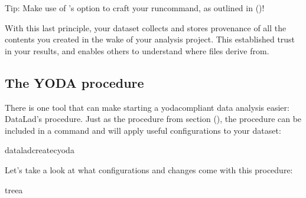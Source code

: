 \sphinxAtStartPar
Tip: Make use of ’s  option to craft your run\sphinxhyphen{}command, as outlined in {\hyperref[\detokenize{basics/101-110-run2:dryrun}]{}} ()!

\sphinxAtStartPar
With this last principle, your dataset collects and stores provenance
of all the contents you created in the wake of your analysis project.
This established trust in your results, and enables others to understand
where files derive from.


\subsection{The YODA procedure}
\label{\detokenize{basics/101-127-yoda:the-yoda-procedure}}\label{\detokenize{basics/101-127-yoda:yodaproc}}
\sphinxAtStartPar
There is one tool that can make starting a yoda\sphinxhyphen{}compliant data analysis
easier: DataLad’s  procedure. Just as the  procedure
from section {\hyperref[\detokenize{basics/101-101-create:createds}]{}} (), the  procedure can be included in a
 command and will apply useful configurations
to your dataset:

\begin{sphinxVerbatim}[commandchars=\\\{\}]
dataladcreate\PYGZhy{}cyoda

\end{sphinxVerbatim}

\sphinxAtStartPar
Let’s take a look at what configurations and changes come with this procedure:

\begin{sphinxVerbatim}[commandchars=\\\{\}]
tree\PYGZhy{}a

\end{sphinxVerbatim}

